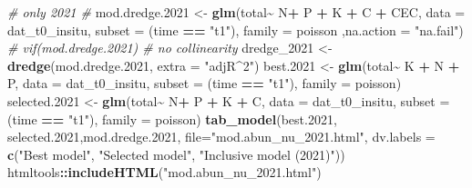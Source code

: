 \documentclass[
]{article}
\newenvironment{Shaded}{\begin{snugshade}}{\end{snugshade}}
\newcommand{\AttributeTok}[1]{\textcolor[rgb]{0.13,0.29,0.53}{#1}}
\newcommand{\CommentTok}[1]{\textcolor[rgb]{0.56,0.35,0.01}{\textit{#1}}}
\newcommand{\FloatTok}[1]{\textcolor[rgb]{0.00,0.00,0.81}{#1}}
\newcommand{\FunctionTok}[1]{\textcolor[rgb]{0.13,0.29,0.53}{\textbf{#1}}}
\newcommand{\NormalTok}[1]{#1}
\newcommand{\OtherTok}[1]{\textcolor[rgb]{0.56,0.35,0.01}{#1}}
\newcommand{\SpecialCharTok}[1]{\textcolor[rgb]{0.81,0.36,0.00}{\textbf{#1}}}
\newcommand{\StringTok}[1]{\textcolor[rgb]{0.31,0.60,0.02}{#1}}
\begin{document}
\begin{Shaded}
\begin{Highlighting}[]
\CommentTok{\# only 2021 \#}
\NormalTok{mod.dredge}\FloatTok{.2021} \OtherTok{\textless{}{-}} \FunctionTok{glm}\NormalTok{(total}\SpecialCharTok{\textasciitilde{}}\NormalTok{ N}\SpecialCharTok{+}\NormalTok{ P }\SpecialCharTok{+}\NormalTok{ K }\SpecialCharTok{+}\NormalTok{ C }\SpecialCharTok{+}\NormalTok{ CEC, }\AttributeTok{data =}\NormalTok{ dat\_t0\_insitu, }\AttributeTok{subset =}\NormalTok{ (time }\SpecialCharTok{==} \StringTok{"t1"}\NormalTok{), }\AttributeTok{family =}\NormalTok{ poisson ,}\AttributeTok{na.action =} \StringTok{"na.fail"}\NormalTok{)}
\CommentTok{\# vif(mod.dredge.2021) \# no collinearity}
\NormalTok{dredge\_2021 }\OtherTok{\textless{}{-}} \FunctionTok{dredge}\NormalTok{(mod.dredge}\FloatTok{.2021}\NormalTok{, }\AttributeTok{extra =} \StringTok{"adjR\^{}2"}\NormalTok{)}
\NormalTok{best}\FloatTok{.2021} \OtherTok{\textless{}{-}} \FunctionTok{glm}\NormalTok{(total}\SpecialCharTok{\textasciitilde{}}\NormalTok{ K }\SpecialCharTok{+}\NormalTok{ N }\SpecialCharTok{+}\NormalTok{ P, }\AttributeTok{data =}\NormalTok{ dat\_t0\_insitu, }\AttributeTok{subset =}\NormalTok{ (time }\SpecialCharTok{==} \StringTok{"t1"}\NormalTok{), }\AttributeTok{family =}\NormalTok{ poisson)}
\NormalTok{selected}\FloatTok{.2021} \OtherTok{\textless{}{-}} \FunctionTok{glm}\NormalTok{(total}\SpecialCharTok{\textasciitilde{}}\NormalTok{ N}\SpecialCharTok{+}\NormalTok{ P }\SpecialCharTok{+}\NormalTok{ K }\SpecialCharTok{+}\NormalTok{ C, }\AttributeTok{data =}\NormalTok{ dat\_t0\_insitu, }\AttributeTok{subset =}\NormalTok{ (time }\SpecialCharTok{==} \StringTok{"t1"}\NormalTok{), }\AttributeTok{family =}\NormalTok{ poisson)}
\FunctionTok{tab\_model}\NormalTok{(best}\FloatTok{.2021}\NormalTok{, selected}\FloatTok{.2021}\NormalTok{,mod.dredge}\FloatTok{.2021}\NormalTok{, }\AttributeTok{file=}\StringTok{"mod.abun\_nu\_2021.html"}\NormalTok{, }\AttributeTok{dv.labels =} \FunctionTok{c}\NormalTok{(}\StringTok{"Best model"}\NormalTok{, }\StringTok{"Selected model"}\NormalTok{, }\StringTok{"Inclusive model (2021)"}\NormalTok{))}
\NormalTok{htmltools}\SpecialCharTok{::}\FunctionTok{includeHTML}\NormalTok{(}\StringTok{"mod.abun\_nu\_2021.html"}\NormalTok{)}


\end{Highlighting}
\end{Shaded}
\end{document}
